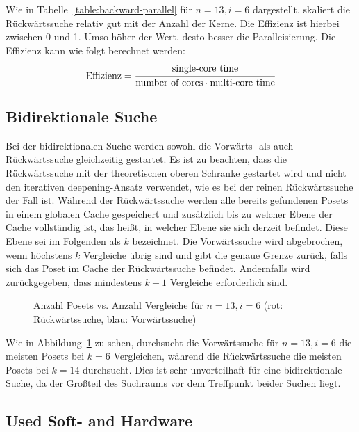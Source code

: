 \documentclass[10pt,journal,compsoc]{IEEEtran}
\begin{document}
Wie in Tabelle~\ref{table:backward-parallel} für $n = 13, i = 6$ dargestellt, skaliert die Rückwärtssuche relativ gut mit der Anzahl der Kerne.
Die Effizienz ist hierbei zwischen 0 und 1.
Umso höher der Wert, desto besser die Paralleisierung.
Die Effizienz kann wie folgt berechnet werden:
\[
  \text{Effizienz} = \cfrac{\text{single-core time}}{\text{number of cores} \cdot \text{multi-core time}}
\]

\subsection{Bidirektionale Suche} \label{sec:bidirectional}

Bei der bidirektionalen Suche werden sowohl die Vorwärts- als auch Rückwärtssuche gleichzeitig gestartet.
Es ist zu beachten, dass die Rückwärtssuche mit der theoretischen oberen Schranke gestartet wird und nicht den iterativen deepening-Ansatz verwendet, wie es bei der reinen Rückwärtssuche der Fall ist.
Während der Rückwärtssuche werden alle bereits gefundenen Posets in einem globalen Cache gespeichert und zusätzlich bis zu welcher Ebene der Cache vollständig ist, das heißt, in welcher Ebene sie sich derzeit befindet.
Diese Ebene sei im Folgenden als $k$ bezeichnet.
Die Vorwärtssuche wird abgebrochen, wenn höchstens $k$ Vergleiche übrig sind und gibt die genaue Grenze zurück, falls sich das Poset im Cache der Rückwärtssuche befindet.
Andernfalls wird zurückgegeben, dass mindestens $k + 1$ Vergleiche erforderlich sind.

\begin{figure}[h!]
  
  \centering
  \caption{Anzahl Posets vs. Anzahl Vergleiche für $n=13, i=6$ (rot: Rückwärtssuche, blau: Vorwärtssuche)}
  \label{fig:backward_forward_count_13_6}
\end{figure}

Wie in Abbildung~\ref{fig:backward_forward_count_13_6} zu sehen, durchsucht die Vorwärtssuche für $n = 13, i = 6$ die meisten Posets bei $k = 6$ Vergleichen, während die Rückwärtssuche die meisten Posets bei $k = 14$ durchsucht.
Dies ist sehr unvorteilhaft für eine bidirektionale Suche, da der Großteil des Suchraums vor dem Treffpunkt beider Suchen liegt.



\subsection{Used Soft- and Hardware}
\end{document}
